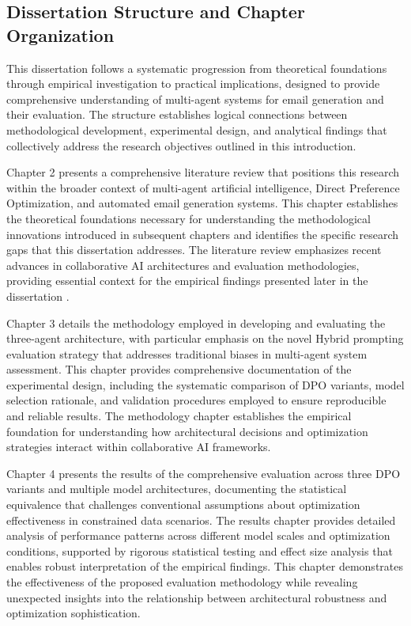 \subsection{Dissertation Structure and Chapter Organization}

This dissertation follows a systematic progression from theoretical foundations through empirical investigation to practical implications, designed to provide comprehensive understanding of multi-agent systems for email generation and their evaluation. The structure establishes logical connections between methodological development, experimental design, and analytical findings that collectively address the research objectives outlined in this introduction.

Chapter 2 presents a comprehensive literature review that positions this research within the broader context of multi-agent artificial intelligence, Direct Preference Optimization, and automated email generation systems. This chapter establishes the theoretical foundations necessary for understanding the methodological innovations introduced in subsequent chapters and identifies the specific research gaps that this dissertation addresses. The literature review emphasizes recent advances in collaborative AI architectures and evaluation methodologies, providing essential context for the empirical findings presented later in the dissertation \cite{ferrag2025llm_autonomous_agents, masterman2024landscape_emerging}.

Chapter 3 details the methodology employed in developing and evaluating the three-agent architecture, with particular emphasis on the novel Hybrid prompting evaluation strategy that addresses traditional biases in multi-agent system assessment. This chapter provides comprehensive documentation of the experimental design, including the systematic comparison of DPO variants, model selection rationale, and validation procedures employed to ensure reproducible and reliable results. The methodology chapter establishes the empirical foundation for understanding how architectural decisions and optimization strategies interact within collaborative AI frameworks.

Chapter 4 presents the results of the comprehensive evaluation across three DPO variants and multiple model architectures, documenting the statistical equivalence that challenges conventional assumptions about optimization effectiveness in constrained data scenarios. The results chapter provides detailed analysis of performance patterns across different model scales and optimization conditions, supported by rigorous statistical testing and effect size analysis that enables robust interpretation of the empirical findings. This chapter demonstrates the effectiveness of the proposed evaluation methodology while revealing unexpected insights into the relationship between architectural robustness and optimization sophistication.

